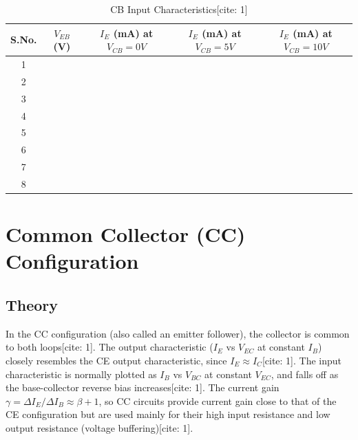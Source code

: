 \documentclass[12pt,a4paper]{article}
\begin{document}
\begin{table}[H]
    \centering
    \caption{CB Input Characteristics[cite: 1]}
    \begin{tabular}{|c|c|c|c|c|}
        \hline
        \textbf{S.No.} & \textbf{$V_{EB}$ (V)} & \textbf{$I_E$ (mA) at $V_{CB}=0 V$} & \textbf{$I_E$ (mA) at $V_{CB}=5 V$} & \textbf{$I_E$ (mA) at $V_{CB}=10 V$} \\ \hline
        1 & & & & \\ \hline
        2 & & & & \\ \hline
        3 & & & & \\ \hline
        4 & & & & \\ \hline
        5 & & & & \\ \hline
        6 & & & & \\ \hline
        7 & & & & \\ \hline
        8 & & & & \\ \hline
    \end{tabular}
\end{table}

\section{Common Collector (CC) Configuration}

\subsection{Theory}
In the CC configuration (also called an emitter follower), the collector is common to both loops[cite: 1]. The output characteristic ($I_E$ vs $V_{EC}$ at constant $I_B$) closely resembles the CE output characteristic, since $I_E \approx I_C$[cite: 1]. The input characteristic is normally plotted as $I_B$ vs $V_{BC}$ at constant $V_{EC}$, and falls off as the base-collector reverse bias increases[cite: 1]. The current gain $\gamma=\Delta I_E/\Delta I_B \approx \beta+1$, so CC circuits provide current gain close to that of the CE configuration but are used mainly for their high input resistance and low output resistance (voltage buffering)[cite: 1].
\end{document}
